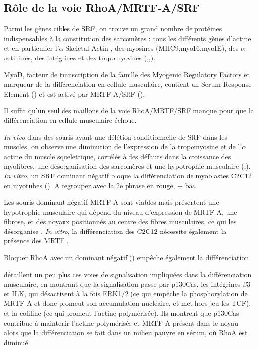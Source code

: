 \subsection{Rôle de la voie RhoA/MRTF-A/SRF}

Parmi les gènes cibles de SRF, on trouve un grand nombre de protéines indispensables à la constitution des sarcomères :  tous les différents gènes d'actine et en particulier l'$\alpha$ Skeletal Actin , des myosines (MHC9,myo16,myoIE), des $\alpha$-actinines, des intégrines et des tropomyosines (\cite{selvaraj_megakaryoblastic_2003},\cite{charvet_new_2006},\cite{esnault_rho-actin_2014}).

MyoD, facteur de transcription de la famille des Myogenic Regulatory Factors et marqueur de la différenciation en cellule musculaire, contient un Serum Response Element (\cite{lhonore_myod_2003}) et est activé par MRTF-A/SRF (\cite{mokalled_mastr_2012}). 

Il suffit qu'un seul des maillons de la voie RhoA/MRTF/SRF manque pour que la différenciation en cellule musculaire échoue. 

\textit{In vivo} dans des souris ayant une délétion conditionnelle de SRF dans les muscles, on observe une diminution de l'expression de la tropomyosine et de l'$\alpha$ actine du muscle squelettique, corrélés à des défauts dans la croissance des myofibres, une désorganisation des sarcomères et une hypotrophie musculaire (\cite{charvet_new_2006},\cite{li_requirement_2005}). \textit{In vitro}, un SRF dominant négatif bloque la différenciation de myoblastes C2C12 en myotubes (\cite{wei_rhoa_1998}). A regrouper avec la 2e phrase en rouge, + bas.

Les souris dominant négatif MRTF-A sont viables mais présentent une hypotrophie musculaire qui dépend du niveau d'expression de MRTF-A, une fibrose, et des noyaux positionnés au centre des fibres musculaires, ce qui les désorganise \cite{li_requirement_2005}. \textit{In vitro}, la différenciation des C2C12 nécessite également la présence des MRTF \cite{selvaraj_megakaryoblastic_2003}.


Bloquer RhoA avec un dominant négatif (\cite{wei_rhoa_1998}) empêche également la différenciation.

\cite{kawauchi_p130cas-dependent_2012} détaillent un peu plus ces voies de signalisation impliquées dans la différenciation musculaire, en montrant que la signalisation passe par p130Cas, les intégrines $\beta$3 et ILK, qui désactivent à la fois ERK1/2 (ce qui empêche la phosphorylation de MRTF-A et donc promeut son accumulation nucléaire, et met hors-jeu les TCF), et la cofiline (ce qui promeut l'actine polymérisée). Ils montrent que p130Cas contribue à maintenir l'actine polymérisée et MRTF-A présent dans le noyau alors que la différenciation se fait dans un milieu pauvre en sérum, où RhoA est diminué. 
 
